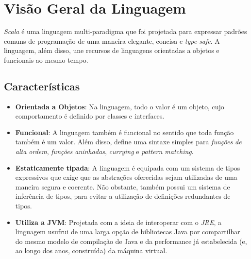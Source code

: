 \documentclass[rel_mlp]{iiufrgs}
\begin{document}




\chapter{Visão Geral da Linguagem}\label{visao}

\textit{Scala} é uma linguagem multi-paradigma que foi projetada para expressar padrões comuns de programação de uma maneira elegante, concisa e \textit{type-safe}.
A linguagem, além disso, une recursos de linguagens orientadas a objetos e funcionais ao mesmo tempo.

\section{Características}

\begin{itemize}[leftmargin=3em]
\setlength{\itemindent}{1em}
    \item \textbf{Orientada a Objetos}:
    Na linguagem, todo o valor é um objeto, cujo comportamento é definido por classes e interfaces.
    \item \textbf{Funcional}:
    A linguagem também é funcional no sentido que toda função também é um valor. Além disso, define uma sintaxe simples para \textit{funções de alta ordem}, \textit{funções aninhadas}, \textit{currying} e \textit{pattern matching}.
    \item \textbf{Estaticamente tipada}:
    A linguagem é equipada com um sistema de tipos expressivos que exige que as abstrações oferecidas sejam utilizadas de uma maneira segura e coerente. Não obstante, também possui um sistema de inferência de tipos, para evitar a utilização de definições redundantes de tipos.
    \item \textbf{Utiliza a JVM}:
    Projetada com a ideia de interoperar com o \textit{JRE}, a linguagem usufrui de uma larga opção de bibliotecas Java por compartilhar do mesmo modelo de compilação de Java e da performance já estabelecida (e, ao longo dos anos, construída) da máquina virtual.
\end{itemize}
\end{document}
